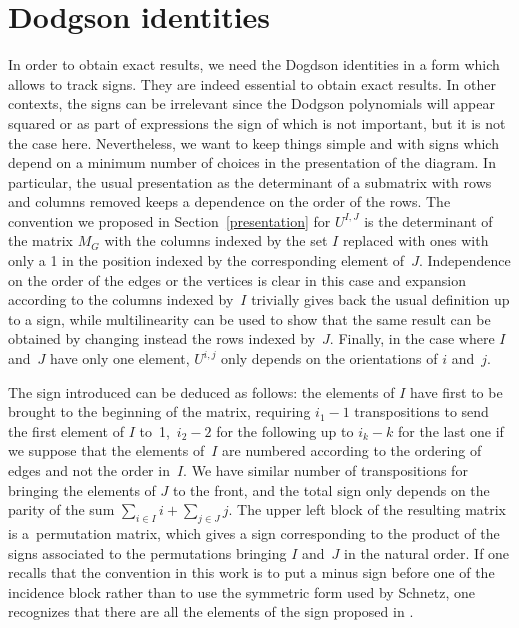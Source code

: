 \documentclass[11pt]{article}
\numberwithin{equation}{section}
\begin{document}
\section{Dodgson identities}\label{polyn}

In order to obtain exact results, we need the Dogdson identities in a form which allows to track signs.
They are indeed essential to obtain exact results. In other contexts, the signs can be irrelevant
since the Dodgson polynomials will appear squared or as part of expressions the sign of which is not important,
but it is not the case here. Nevertheless, we want to keep things simple and with
signs which depend on a minimum number of choices in the presentation of the diagram. In particular, the usual
presentation as the determinant of a submatrix with rows and columns removed keeps a dependence on the order
of the rows. The convention we proposed in Section~\ref{presentation} for $U^{I ,J}$ is the determinant of the matrix
$M_G$ with the columns indexed by the set $I$ replaced with ones with only a 1 in the position indexed by the corresponding
element of~$J$. Independence on the order of the edges or the vertices is clear in this case and expansion according to
the columns indexed by~$I$ trivially gives back the usual definition up to a sign, while multilinearity can be used to
show that the same result can be obtained by changing instead the rows indexed by~$J$. Finally, in the case where $I$
and~$J$ have only one element, $U^{i,j}$ only depends on the orientations of $i$ and~$j$.

The sign introduced can be deduced as follows: the elements of $I$ have first to be brought to the beginning of the matrix,
requiring $i_1 - 1$ transpositions to send the first element of $I$ to~1,~${i_2 -2}$ for the following up to $i_k -k $
for the last one if we suppose that the elements of~$I$ are numbered according to the ordering of edges and not the order in~$I$.
We have similar number of transpositions for bringing the elements of $J$ to the front, and the total sign only depends on the parity
of the sum $\sum_{i\in I} i+ \sum_{j\in J} j$. The upper left block of the resulting matrix is a~permutation matrix, which gives a sign
corresponding to the product of the signs associated to the permutations bringing $I$ and~$J$ in the natural order. If one recalls that
the convention in this work is to put a minus sign before one of the incidence block rather than to use the symmetric form used by Schnetz,
one recognizes that there are all the elements of the sign proposed in \cite[equation~(8)]{SC2021}.
\end{document}
